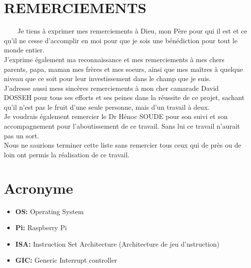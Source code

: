 \documentclass[12pt,a4paper,oneside]{book}
\begin{document}
	\chapter{REMERCIEMENTS} 
	$\qquad$Je tiens à exprimer mes remerciements à Dieu, mon Père pour qui il est et ce qu'il ne cesse d'accomplir en moi pour que je sois une bénédiction pour tout le monde entier. \\
	
	J'exprime également ma reconnaissance et mes remerciements à mes chers parents, papa, maman mes frères et mes soeurs, ainsi que mes maîtres à quelque niveau que ce soit pour leur investissement dans le champ que je suis.\\
	
	J'adresse aussi mess sincères remerciements à mon cher camarade David DOSSEH pour tous ses efforts et ses peines dans la réussite de ce projet, sachant qu'il n'est pas le fruit d'une seule personne, mais d'un travail à deux. \\
	
	Je voudrais également remercier le Dr Hénoc SOUDE pour son suivi et son accompagnement pour l'aboutissement de ce travail. Sans lui ce travail n'aurait pas un sort.\\
	
	Nous ne saurions terminer cette liste sans remercier tous ceux qui de près ou de loin ont permis la réalisation de ce travail.
		
		
	\chapter{Acronyme}
	\begin{itemize}
	\item \textbf{OS:} Operating System\\
	\item \textbf{Pi:} Raspberry Pi\\
	\item \textbf{ISA:} Instruction Set Architecture (Architecture de jeu d'nstruction)\\
	\item \textbf{GIC:} Generic Interrupt controller\\
\end{itemize}
	
	\listoffigures
                                                                                                                                                                                                                                   
\end{document}
